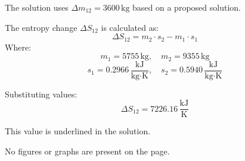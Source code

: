 The solution uses \( \Delta m_{12} = 3600 \, \text{kg} \) based on a proposed solution.  

The entropy change \( \Delta S_{12} \) is calculated as:  
\[
\Delta S_{12} = m_2 \cdot s_2 - m_1 \cdot s_1
\]  
Where:  
\[
m_1 = 5755 \, \text{kg}, \quad m_2 = 9355 \, \text{kg}
\]  
\[
s_1 = 0.2966 \, \frac{\text{kJ}}{\text{kg·K}}, \quad s_2 = 0.5940 \, \frac{\text{kJ}}{\text{kg·K}}
\]  

Substituting values:  
\[
\Delta S_{12} = 7226.16 \, \frac{\text{kJ}}{\text{K}}
\]  

This value is underlined in the solution.  

No figures or graphs are present on the page.